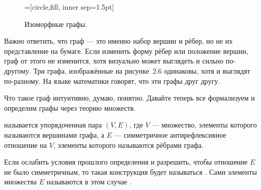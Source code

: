 \begin{figure}[h]
\centering
{}=[circle,fill, inner sep=1.5pt]
\caption{Изоморфные графы.}
\end{figure}

Важно ответить, что граф — это именно набор вершин и рёбер, но не их представление на бумаге. Если изменить форму рёбер или положение вершин, граф от этого не изменится, хотя визуально может выглядеть и сильно по-другому. Три графа, изображённые на рисунке~2.6 одинаковы, хотя и выглядят по-разному. На языке математики говорят, что эти графы  друг другу.

Что такое граф интуитивно, думаю, понятно. Давайте теперь все формализуем и определим графы через теорию множеств.

\begin{definition}
 называется упорядоченная пара $(V, E)$, где $V$ — множество, элементы которого называются вершинами графа, а $E$ — симметричное антирефлексивное отношение на $V$, элементы которого называются рёбрами графа.
\end{definition}

\begin{definition}
Если ослабить условия прошлого определения и разрешить, чтобы отношение $E$ не было симметричным, то такая конструкция будет называться . Сами элементы множества $E$ называются в этом случае .
\end{definition}

